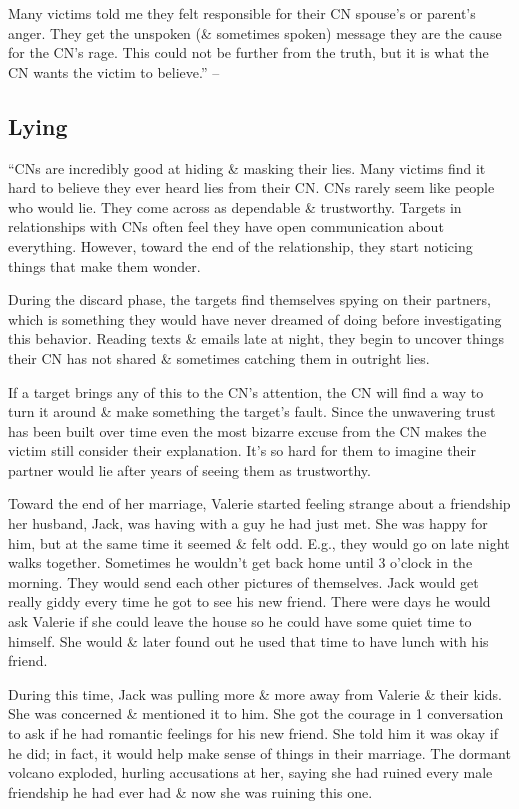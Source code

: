 \documentclass{article}
\numberwithin{equation}{section}
\begin{document}
Many victims told me they felt responsible for their CN spouse's or parent's anger. They get the unspoken (\& sometimes spoken) message they are the cause for the CN's rage. This could not be further from the truth, but it is what the CN wants the victim to believe.'' -- \cite[pp. 51--52]{Mirza2017}

\subsection{Lying}
``CNs are incredibly good at hiding \& masking their lies. Many victims find it hard to believe they ever heard lies from their CN. CNs rarely seem like people who would lie. They come across as dependable \& trustworthy. Targets in relationships with CNs often feel they have open communication about everything. However, toward the end of the relationship, they start noticing things that make them wonder.

During the discard phase, the targets find themselves spying on their partners, which is something they would have never dreamed of doing before investigating this behavior. Reading texts \& emails late at night, they begin to uncover things their CN has not shared \& sometimes catching them in outright lies.

If a target brings any of this to the CN's attention, the CN will find a way to turn it around \& make something the target's fault. Since the unwavering trust has been built over time even the most bizarre excuse from the CN makes the victim still consider their explanation. It's so hard for them to imagine their partner would lie after years of seeing them as trustworthy.

Toward the end of her marriage, Valerie started feeling strange about a friendship her husband, Jack, was having with a guy he had just met. She was happy for him, but at the same time it seemed \& felt odd. E.g., they would go on late night walks together. Sometimes he wouldn't get back home until 3 o'clock in the morning. They would send each other pictures of themselves. Jack would get really giddy every time he got to see his new friend. There were days he would ask Valerie if she could leave the house so he could have some quiet time to himself. She would \& later found out he used that time to have lunch with his friend.

During this time, Jack was pulling more \& more away from Valerie \& their kids. She was concerned \& mentioned it to him. She got the courage in 1 conversation to ask if he had romantic feelings for his new friend. She told him it was okay if he did; in fact, it would help make sense of things in their marriage. The dormant volcano exploded, hurling accusations at her, saying she had ruined every male friendship he had ever had \& now she was ruining this one.
\end{document}
